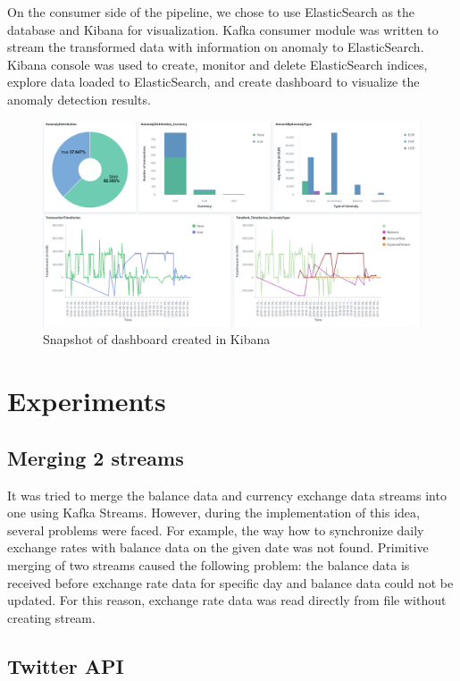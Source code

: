 \documentclass{article}
\begin{document}
On the consumer side of the pipeline, we chose to use ElasticSearch as the database and Kibana for visualization. Kafka consumer module was written to stream the transformed data with information on anomaly to ElasticSearch. Kibana console was used to create, monitor and delete ElasticSearch indices, explore data loaded to ElasticSearch, and create dashboard to visualize the anomaly detection results.

\begin{figure}[h!]
\centering
\includegraphics[width=\textwidth]{Dashboard_snapshot.PNG}
\caption{Snapshot of dashboard created in Kibana}
\label{fig:OuptutDashboard}
\end{figure}


\section{Experiments}

\subsection{Merging 2 streams}

It was tried to merge the balance data and currency exchange data streams into one using Kafka Streams. However, during the implementation of this idea, several problems were faced. For example, the way how to synchronize daily exchange rates with balance data on the given date was not found. Primitive merging of two streams caused the following problem: the balance data is received before exchange rate data for specific day and balance data could not be updated. For this reason, exchange rate data was read directly from file without creating stream.

\subsection{Twitter API}
\end{document}
